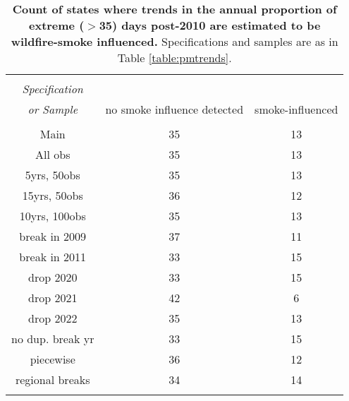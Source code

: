 \begin{table}[!htbp] \centering 
  \caption{\textbf{Count of states where trends in the annual proportion of extreme ($>$35\ug) days post-2010 are estimated to be wildfire-smoke influenced.} Specifications and samples are as in Table \ref{table:pmtrends}.} 
  \label{table:extremes_smokeinfluence} 
\footnotesize 
\begin{tabular}{@{\extracolsep{5pt}} ccc} 
\\[-1.8ex]\hline 
\hline \\[-1.8ex] 
\textit{Specification} \\ 
\textit{or Sample} & no smoke influence detected & smoke-influenced \\ 
\hline \\[-1.8ex] 
Main & 35 & 13 \\ 
All obs & 35 & 13 \\ 
5yrs, 50obs & 35 & 13 \\ 
15yrs, 50obs & 36 & 12 \\ 
10yrs, 100obs & 35 & 13 \\ 
break in 2009 & 37 & 11 \\ 
break in 2011 & 33 & 15 \\ 
drop 2020 & 33 & 15 \\ 
drop 2021 & 42 & 6 \\ 
drop 2022 & 35 & 13 \\ 
no dup. break yr & 33 & 15 \\ 
piecewise & 36 & 12 \\ 
regional breaks & 34 & 14 \\ 
\hline \\[-1.8ex] 
\end{tabular} 
\end{table} 
